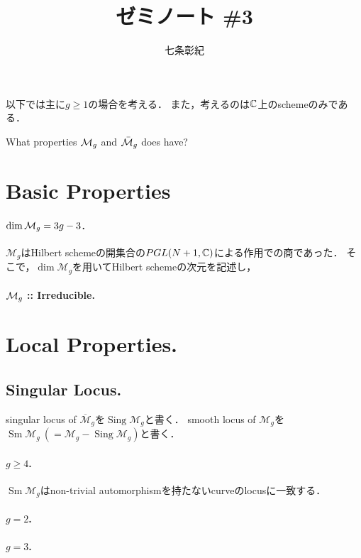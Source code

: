 \documentclass[a4paper]{jsarticle}
\newcommand{\M}{\mathcal{M}}
\newcommand{\barM}{\overline{\mathcal{M}}}
\newcommand{\Sing}{\operatorname{Sing}}
\newcommand{\Sm}{\operatorname{Sm}}
\begin{document}
\title{ゼミノート \#3}
\author{七条彰紀}
\maketitle

以下では主に$g \geq 1$の場合を考える．
また，考えるのは$\mathbb{C}$上のschemeのみである．

\begin{problem}
    What properties $\mathcal{M}_g$ and $\bar{\mathcal{M}}_g$ does have?
\end{problem}

\section{Basic Properties}
    \paragraph{$\dim \mathcal{M}_g=3g-3$.}
    $\M_g$はHilbert schemeの開集合の$PGL(N+1, \mathbb{C})$による作用での商であった．
    そこで，$\dim \M_g$を用いてHilbert schemeの次元を記述し，


    \paragraph{$\mathcal{M}_g$ :: Irreducible.}

\section{Local Properties.}
    \subsection{Singular Locus.}
        singular locus of $\barM_g$を$\Sing \M_g$と書く．
        smooth locus of $\M_g$を$\Sm \M_g \ (=\M_g-\Sing \M_g)$と書く．
        \paragraph{$g \geq 4$.}
            $\Sm \M_g$はnon-trivial automorphismを持たないcurveのlocusに一致する．

        \paragraph{$g=2$.}
        
        \paragraph{$g=3$.}
\end{document}
